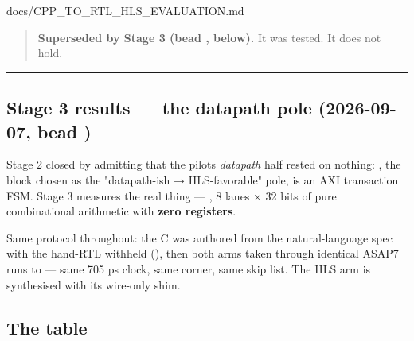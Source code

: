 \begin{relocated}{docs/CPP_TO_RTL_HLS_EVALUATION.md}
\begin{quote}
\textbf{Superseded by Stage 3 (bead , below).} It was tested.
It does not hold.
\end{quote}

\begin{center}\rule{0.5\linewidth}{0.5pt}\end{center}

\subsection{\texorpdfstring{Stage 3 results --- the datapath pole
(2026-09-07, bead
)}{Stage 3 results --- the datapath pole (2026-09-07, bead )}}\label{tm:dec:cpp-to-rtl-hls-evaluation:stage-3-results-the-datapath-pole-2026-09-07-bead-gg8}

Stage 2 closed by admitting that the pilot\textquotesingle s
\emph{datapath} half rested on nothing: , the
block chosen as the "datapath-ish → HLS-favorable" pole, is an AXI
transaction FSM. Stage 3 measures the real thing ---
, 8 lanes × 32 bits of pure combinational
arithmetic with \textbf{zero registers}.

Same protocol throughout: the C was authored from the natural-language
spec with the hand-RTL withheld
(), then both arms taken through
identical ASAP7 runs to  --- same 705 ps clock,
same  corner, same skip list. The HLS arm is
synthesised with its wire-only shim.

\subsection{The table}\label{tm:dec:cpp-to-rtl-hls-evaluation:the-table-1}


\end{relocated}

